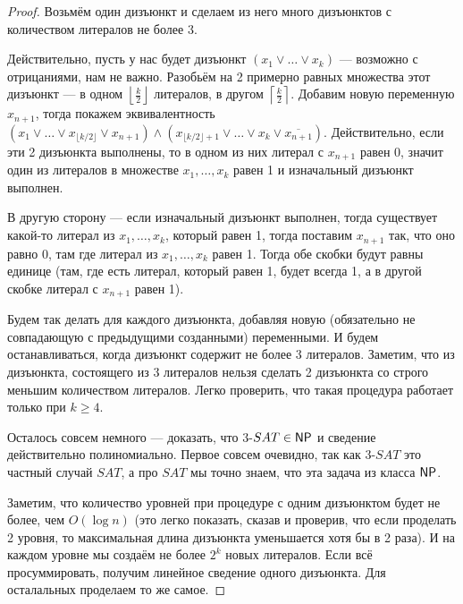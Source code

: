 \documentclass[a4paper, 12pt]{article}
\begin{document}
\begin{proof}
  Возьмём один дизъюнкт и сделаем из него много дизъюнктов с количеством
  литералов не более 3.

  Действительно, пусть у нас будет дизъюнкт $(x_1 \vee \ldots \vee x_{k})$ --- 
  возможно
  с отрицаниями, нам не важно. Разобьём на 2 примерно равных множества этот
  дизъюнкт --- в одном $\left\lfloor \frac{k}{2} \right\rfloor$ литералов, в
  другом $\left\lceil \frac{k}{2} \right\rceil$. Добавим новую переменную $x_{n + 1}$,
  тогда покажем эквивалентность $(x_1 \vee \ldots \vee 
  x_{\lfloor k/2\rfloor} \vee x_{n + 1}) \wedge (x_{\lfloor k/2 \rfloor + 1}
  \vee \ldots \vee 
  x_{k} \vee \overline{x_{n + 1}})$. Действительно, если эти 2 дизъюнкта выполнены,
  то в одном из них литерал с $x_{n + 1}$ равен 0, значит один из литералов
  в множестве $x_1, \ldots, x_k$ равен 1 и изначальный дизъюнкт выполнен.

  В другую сторону --- если изначальный дизъюнкт выполнен, тогда существует
  какой-то литерал из $x_1, \ldots, x_k$, который равен 1, тогда поставим $x_{n + 1}$
  так, что оно равно 0, там где литерал из $x_1, \ldots, x_k$ равен 1. Тогда
  обе скобки будут равны единице (там, где есть литерал, который равен 1, будет
  всегда 1, а в другой скобке литерал с $x_{n + 1}$ равен 1).

  Будем так делать для каждого дизъюнкта, добавляя новую (обязательно не
  совпадающую с предыдущими созданными) переменными. И будем останавливаться,
  когда дизъюнкт содержит не более 3 литералов. Заметим, что из дизъюнкта,
  состоящего из 3 литералов нельзя сделать 2 дизъюнкта со строго меньшим
  количеством литералов. Легко проверить, что такая процедура работает только
  при $k \geqslant 4$. 

  Осталось совсем немного --- доказать, что 3-$SAT \in \mathsf{NP}$ и сведение
  действительно полиномиально. Первое совсем очевидно, так как 3-$SAT$ это
  частный случай $SAT$, а про $SAT$ мы точно знаем, что эта задача из класса
  $\mathsf{NP}$.

  Заметим, что количество уровней при процедуре с одним дизъюнктом будет не более,
  чем $O(\log n)$ (это легко показать, сказав и проверив, что если проделать
  2 уровня, то максимальная длина дизъюнкта уменьшается хотя бы в 2 раза). И на
  каждом уровне мы создаём не более $2^k$ новых литералов. Если всё просуммировать,
  получим линейное сведение одного дизъюнкта. Для осталальных проделаем то же
  самое.
\end{proof}
\end{document}
